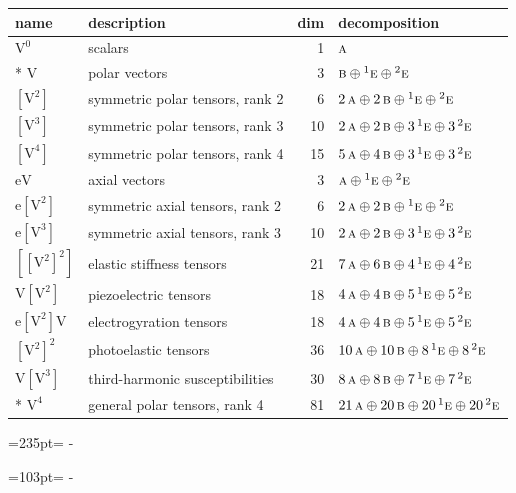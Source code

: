 \documentclass[10pt,a4paper]{article}
\newcommand{\needspace}[1]{\par\penalty-100\begingroup\dimen0=#1\relax\dimen2=\pagegoal
  \advance\dimen2-\pagetotal\ifdim\dimen0>\dimen2\relax\ifdim\dimen2>0pt\vfil\break\fi\fi
  \endgroup}
\numberwithin{equation}{section}
\newcommand{\irr}[1]{\text{\normalfont\scshape #1}}
\newcommand{\conjpair}[1]{{}^{#1}}
\newcommand{\jahn}[1]{\mathrm{#1}}
\newlength{\fillwidth}\newlength{\cellwidth}\newlength{\colwidth}
\begin{document}
{\begin{longtable}{@{}llr>{\RaggedRight\arraybackslash}p{\fillwidth}@{}}
name & description & dim & decomposition\\\midrule\endhead
\bottomrule\endfoot\endlastfoot
$\jahn{V^{0}}$ & scalars & 1 & $\irr{a}$\\*
$\jahn{V}$ & polar vectors & 3 & $\irr{b} \oplus\allowbreak \conjpair{1}\irr{e} \oplus\allowbreak \conjpair{2}\irr{e}$\\
$\jahn{[V^{2}]}$ & symmetric polar tensors, rank 2 & 6 & $2\,\irr{a} \oplus\allowbreak 2\,\irr{b} \oplus\allowbreak \conjpair{1}\irr{e} \oplus\allowbreak \conjpair{2}\irr{e}$\\
$\jahn{[V^{3}]}$ & symmetric polar tensors, rank 3 & 10 & $2\,\irr{a} \oplus\allowbreak 2\,\irr{b} \oplus\allowbreak 3\,\conjpair{1}\irr{e} \oplus\allowbreak 3\,\conjpair{2}\irr{e}$\\
$\jahn{[V^{4}]}$ & symmetric polar tensors, rank 4 & 15 & $5\,\irr{a} \oplus\allowbreak 4\,\irr{b} \oplus\allowbreak 3\,\conjpair{1}\irr{e} \oplus\allowbreak 3\,\conjpair{2}\irr{e}$\\
$\jahn{eV}$ & axial vectors & 3 & $\irr{a} \oplus\allowbreak \conjpair{1}\irr{e} \oplus\allowbreak \conjpair{2}\irr{e}$\\
$\jahn{e[V^{2}]}$ & symmetric axial tensors, rank 2 & 6 & $2\,\irr{a} \oplus\allowbreak 2\,\irr{b} \oplus\allowbreak \conjpair{1}\irr{e} \oplus\allowbreak \conjpair{2}\irr{e}$\\
$\jahn{e[V^{3}]}$ & symmetric axial tensors, rank 3 & 10 & $2\,\irr{a} \oplus\allowbreak 2\,\irr{b} \oplus\allowbreak 3\,\conjpair{1}\irr{e} \oplus\allowbreak 3\,\conjpair{2}\irr{e}$\\
$\jahn{[[V^{2}]^{2}]}$ & elastic stiffness tensors & 21 & $7\,\irr{a} \oplus\allowbreak 6\,\irr{b} \oplus\allowbreak 4\,\conjpair{1}\irr{e} \oplus\allowbreak 4\,\conjpair{2}\irr{e}$\\
$\jahn{V[V^{2}]}$ & piezoelectric tensors & 18 & $4\,\irr{a} \oplus\allowbreak 4\,\irr{b} \oplus\allowbreak 5\,\conjpair{1}\irr{e} \oplus\allowbreak 5\,\conjpair{2}\irr{e}$\\
$\jahn{e[V^{2}]V}$ & electrogyration tensors & 18 & $4\,\irr{a} \oplus\allowbreak 4\,\irr{b} \oplus\allowbreak 5\,\conjpair{1}\irr{e} \oplus\allowbreak 5\,\conjpair{2}\irr{e}$\\
$\jahn{[V^{2}]^{2}}$ & photoelastic tensors & 36 & $10\,\irr{a} \oplus\allowbreak 10\,\irr{b} \oplus\allowbreak 8\,\conjpair{1}\irr{e} \oplus\allowbreak 8\,\conjpair{2}\irr{e}$\\
$\jahn{V[V^{3}]}$ & third-harmonic susceptibilities & 30 & $8\,\irr{a} \oplus\allowbreak 8\,\irr{b} \oplus\allowbreak 7\,\conjpair{1}\irr{e} \oplus\allowbreak 7\,\conjpair{2}\irr{e}$\\*
$\jahn{V^{4}}$ & general polar tensors, rank 4 & 81 & $21\,\irr{a} \oplus\allowbreak 20\,\irr{b} \oplus\allowbreak 20\,\conjpair{1}\irr{e} \oplus\allowbreak 20\,\conjpair{2}\irr{e}$\\
\bottomrule\end{longtable}}
\needspace{235pt}
\needspace{103pt}
\end{document}

